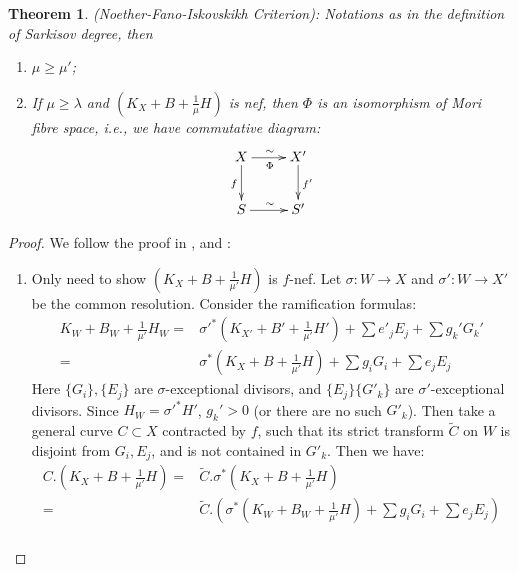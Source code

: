 \documentclass{article}
\newtheorem{thm}[defn]{Theorem}
\begin{document}
\begin{thm}\label{nfi}
  (Noether-Fano-Iskovskikh Criterion): Notations as in the definition of Sarkisov degree, then 
  \begin{enumerate}
    \item $ \mu\geqslant \mu' $;
    \item If $ \mu \geqslant \lambda $ and $ (K_X+B+\frac{1}{\mu} H) $ is nef, then $\Phi$ is an isomorphism of Mori fibre space, i.e., we have commutative diagram: 
      \[ \xymatrix{
          X\ar[r]^\sim_\Phi\ar[d]_f&X'\ar[d]^{f'}\\
      S\ar[r]^\sim& S' } \]
  \end{enumerate}
\end{thm}

\begin{proof}
  We follow the proof in \cite{haconMinimalModelProgram2012},\cite{liuSarkisovProgramGeneralized2019} and \cite{cortiFactoringBirationalMaps}:
  \begin{enumerate}
    \item Only need to show $ (K_X+B+\frac{1}{\mu'}H) $ is $ f $-nef.   Let $\sigma:W\to X$ and $\sigma':W\to X'$ be the common resolution. Consider the ramification formulas:
      \[
        \begin{aligned}  
          K_W+B_W+\frac{1}{\mu'}H_W=&\sigma'^*(K_{X'}+B'+\frac{1}{\mu'}H')+\sum e'_jE_j+ \sum g_k'G_k'\\
          =&\sigma^*(K_{X}+B+\frac{1}{\mu'}H)+\sum g_iG_i+\sum e_jE_j
        \end{aligned}
      \]
      Here $ \{G_i\}, \{E_j\} $ are $ \sigma $-exceptional divisors, and $ \{E_j\}\{G'_k\} $ are $ \sigma' $-exceptional divisors. Since $H_W=\sigma'^*H' $, $ g_k'>0 $ (or there are no such $ G'_k $). Then take a general curve $ C\subset X $ contracted by $ f $, such that its strict transform $ \tilde{C} $ on $ W $ is disjoint from $ G_i, E_j $, and is not contained in $ G'_k $. Then we have:
      \[
        \begin{aligned}
          C.\left(K_X+B+\frac{1}{\mu'}H\right)=&\tilde{C}.\sigma^*\left(K_X+B+\frac{1}{\mu'}H\right)
          \\=&\tilde{C}.\left(\sigma^*\left(K_W+B_{W}+\frac{1}{\mu'}H\right)+\sum g_iG_i+\sum e_jE_j\right)\\

\end{aligned}\]
\end{enumerate}
\end{proof}
\end{document}
